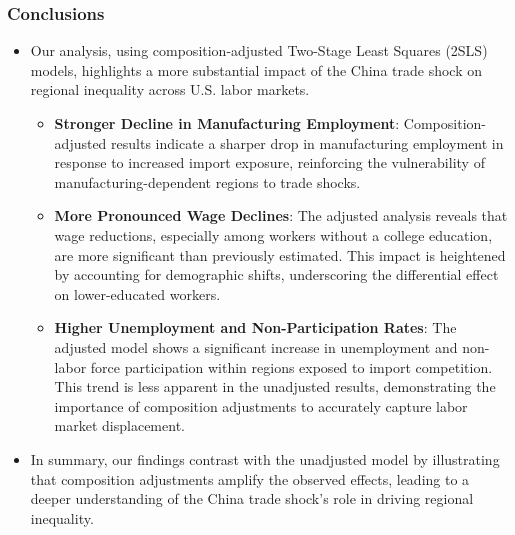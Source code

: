 \begin{frame}
    \frametitle{Conclusions}

    \begin{itemize}
        \item Our analysis, using composition-adjusted Two-Stage Least Squares (2SLS) models, highlights a more substantial impact of the China trade shock on regional inequality across U.S. labor markets.
        
        \begin{itemize}
            \item \textbf{Stronger Decline in Manufacturing Employment}: Composition-adjusted results indicate a sharper drop in manufacturing employment in response to increased import exposure, reinforcing the vulnerability of manufacturing-dependent regions to trade shocks.
            
            \item \textbf{More Pronounced Wage Declines}: The adjusted analysis reveals that wage reductions, especially among workers without a college education, are more significant than previously estimated. This impact is heightened by accounting for demographic shifts, underscoring the differential effect on lower-educated workers.
            
            \item \textbf{Higher Unemployment and Non-Participation Rates}: The adjusted model shows a significant increase in unemployment and non-labor force participation within regions exposed to import competition. This trend is less apparent in the unadjusted results, demonstrating the importance of composition adjustments to accurately capture labor market displacement.
        \end{itemize}
        
        \item In summary, our findings contrast with the unadjusted model by illustrating that composition adjustments amplify the observed effects, leading to a deeper understanding of the China trade shock’s role in driving regional inequality.
    \end{itemize}

\end{frame}
